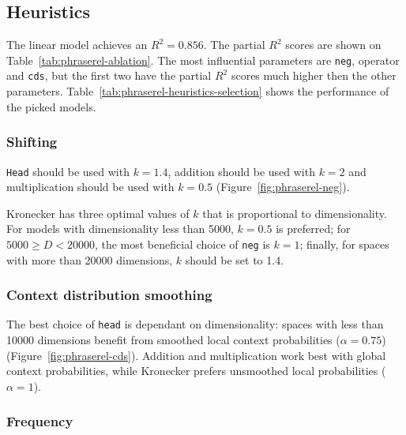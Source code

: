 \subsection{Heuristics}
\label{sec:heuristics-phraserel}




The linear model achieves an $R^2 = 0.856$. The partial $R^2$ scores are shown on Table~\ref{tab:phraserel-ablation}. The most influential parameters are \texttt{neg}, operator and \texttt{cds}, but the first two have the partial $R^2$ scores much higher then the other parameters. Table~\ref{tab:phraserel-heuristics-selection} shows the performance of the picked models.

\subsubsection{Shifting}
\label{sec:shifting-phraserel}

\texttt{Head} should be used with $k = 1.4$, addition should be used with $k = 2$ and multiplication should be used with $k = 0.5$ (Figure~\ref{fig:phraserel-neg}).

Kronecker has three optimal values of $k$ that is proportional to dimensionality. For models with dimensionality less than 5000, $k = 0.5$ is preferred; for $5000 \geq D < 20000$, the most beneficial choice of \texttt{neg} is $k = 1$; finally, for spaces with more than 20000 dimensions, $k$ should be set to 1.4.

\subsubsection{Context distribution smoothing}
\label{sec:cont-distr-smooth-phraserel}

The best choice of \texttt{head} is dependant on dimensionality: spaces with less than 10000 dimensions benefit from smoothed local context probabilities ($\alpha = 0.75$) (Figure~\ref{fig:phraserel-cds}). Addition and multiplication work best with global context probabilities, while Kronecker prefers unsmoothed local probabilities ($\alpha = 1$).

\subsubsection{Frequency}
\label{sec:frequency-phraserel}



